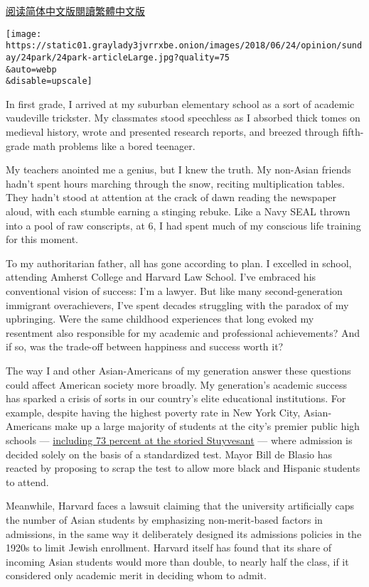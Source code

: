 \href{https://cn.nytimes3xbfgragh.onion/opinion/20180625/asian-american-tiger-parents/}{阅读简体中文版}\href{https://cn.nytimes3xbfgragh.onion/opinion/20180625/asian-american-tiger-parents/zh-hant}{閱讀繁體中文版}

\texttt{[image: https://static01.graylady3jvrrxbe.onion/images/2018/06/24/opinion/sunday/24park/24park-articleLarge.jpg?quality=75\\\&auto=webp\\\&disable=upscale]}

In first grade, I arrived at my suburban elementary school as a sort of
academic vaudeville trickster. My classmates stood speechless as I
absorbed thick tomes on medieval history, wrote and presented research
reports, and breezed through fifth-grade math problems like a bored
teenager.

My teachers anointed me a genius, but I knew the truth. My non-Asian
friends hadn't spent hours marching through the snow, reciting
multiplication tables. They hadn't stood at attention at the crack of
dawn reading the newspaper aloud, with each stumble earning a stinging
rebuke. Like a Navy SEAL thrown into a pool of raw conscripts, at 6, I
had spent much of my conscious life training for this moment.

To my authoritarian father, all has gone according to plan. I excelled
in school, attending Amherst College and Harvard Law School. I've
embraced his conventional vision of success: I'm a lawyer. But like many
second-generation immigrant overachievers, I've spent decades struggling
with the paradox of my upbringing. Were the same childhood experiences
that long evoked my resentment also responsible for my academic and
professional achievements? And if so, was the trade-off between
happiness and success worth it?

The way I and other Asian-Americans of my generation answer these
questions could affect American society more broadly. My generation's
academic success has sparked a crisis of sorts in our country's elite
educational institutions. For example, despite having the highest
poverty rate in New York City, Asian-Americans make up a large majority
of students at the city's premier public high schools ---
\href{http://schools.nyc.gov/SchoolPortals/02/M475/AboutUs/Statistics/register.htm}{including
73 percent at the storied Stuyvesant} --- where admission is decided
solely on the basis of a standardized test. Mayor Bill de Blasio has
reacted by proposing to scrap the test to allow more black and Hispanic
students to attend.

Meanwhile, Harvard faces a lawsuit claiming that the university
artificially caps the number of Asian students by emphasizing
non-merit-based factors in admissions, in the same way it deliberately
designed its admissions policies in the 1920s to limit Jewish
enrollment. Harvard itself has found that its share of incoming Asian
students would more than double, to nearly half the class, if it
considered only academic merit in deciding whom to admit.

